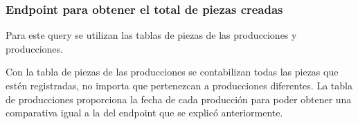 \subsubsection{Endpoint para obtener el total de piezas creadas}
Para este query se utilizan las tablas de piezas de las producciones y producciones.

Con la tabla de piezas de las producciones se contabilizan todas las piezas que estén registradas, no importa que pertenezcan a producciones diferentes. La tabla de producciones proporciona la fecha de cada producción para poder obtener una comparativa igual a la del endpoint que se explicó anteriormente.